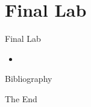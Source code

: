 \documentclass{beamer}
\begin{document}
\section{Final Lab}


\begin{frame}{Final Lab}
    \begin{itemize}
        \item 
    \end{itemize}
\end{frame}


\begin{frame}{Bibliography}
    
    
\end{frame}


\begin{frame}
    \Huge{\centerline{The End}}
\end{frame}
\end{document}
